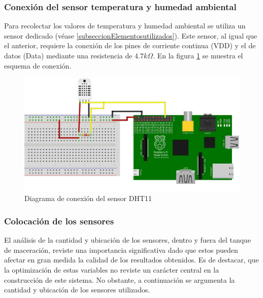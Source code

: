     \subsubsection{Conexión del sensor temperatura y humedad ambiental}
        \par Para recolectar los valores de temperatura y humedad ambiental se utiliza un sensor dedicado (véase \ref{subseccionElementosutilizados}). Este sensor, al igual que el anterior, requiere la conexión de los pines de corriente continua (VDD) y el de datos (Data) mediante una resistencia de $4.7k\Omega$. En la figura \ref{fig:EsquemaDHT11} se muestra el esquema de conexión.
        \begin{figure}[h]
            \centering
            \includegraphics[scale = 0.8]{DiagramaSensorDHT11_bb.jpg}
            \caption{Diagrama de conexión del sensor DHT11}
            \label{fig:EsquemaDHT11}
        \end{figure}
    
    \subsubsection{Colocación de los sensores}
    \label{colocacionDeSensores}
    El análisis de la cantidad y ubicación de los sensores, dentro y fuera del tanque de maceración, reviste una importancia significativa dado que estos pueden afectar en gran medida la calidad de los resultados obtenidos. Es de destacar, que la optimización de estas variables no reviste un carácter central en la construcción de este sistema. No obstante, a continuación se argumenta la cantidad y ubicación de los sensores utilizados.
    
